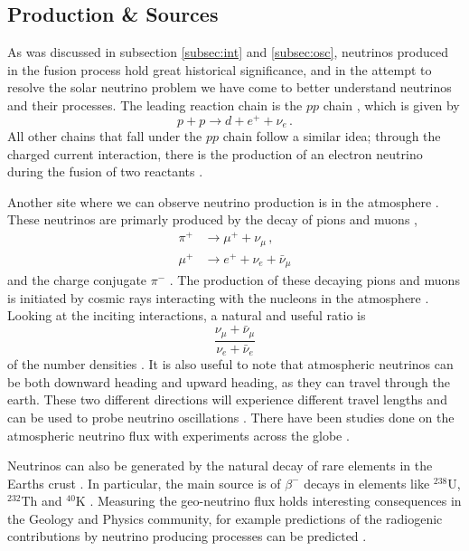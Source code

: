 \subsection{Production \& Sources}

As was discussed in subsection \ref{subsec:int} and \ref{subsec:osc}, neutrinos produced in the fusion process hold great historical significance, and in the attempt to resolve the solar neutrino problem we have come to better understand neutrinos and their processes. The leading reaction chain is the $pp$ chain \cite{pdg,solar_nu}, which is given by \cite{pdg}
\begin{equation}
  p + p \to d + e^{+} + \nu_{e} \, .
\end{equation}
All other chains that fall under the $pp$ chain follow a similar idea; through the charged current interaction, there is the production of an electron neutrino during the fusion of two reactants \cite{pdg}.

Another site where we can observe neutrino production is in the atmosphere \cite{atm_nu,pdg,volk_atm}. These neutrinos are primarly produced by the decay of pions and muons \cite{pdg},
\begin{align}
  \pi^{+} & \to \mu^{+} + \nu_{\mu}\, , \\
  \mu^{+} & \to e^{+} + \nu_{e} + \bar{\nu}_{\mu}
\end{align}
and the charge conjugate $\pi^{-}$ \cite{pdg}. The production of these decaying pions and muons is initiated by cosmic rays interacting with the nucleons in the atmosphere \cite{atm_nu,pdg,volk_atm}. Looking at the inciting interactions, a natural and useful ratio is 
\begin{equation}
  \frac{\nu_{\mu} + \bar{\nu}_{\mu}}{\nu_{e} + \bar{\nu}_{e}}
\end{equation}
of the number densities \cite{pdg}. It is also useful to note that atmospheric neutrinos can be both downward heading and upward heading, as they can travel through the earth. These two different directions will experience different travel lengths and can be used to probe neutrino oscillations \cite{pdg}. There have been studies done on the atmospheric neutrino flux with experiments across the globe \cite{pdg, volk_atm}.

Neutrinos can also be generated by the natural decay of rare elements in the Earths crust \cite{geo_nu}. In particular, the main source is of $\beta^{-}$ decays in elements like $^{238}$U, $^{232}$Th and $^{40}$K \cite{geo_nu}. Measuring the geo-neutrino flux holds interesting consequences in the Geology and Physics community, for example predictions of the radiogenic contributions by neutrino producing processes can be predicted \cite{geo_nu}.

